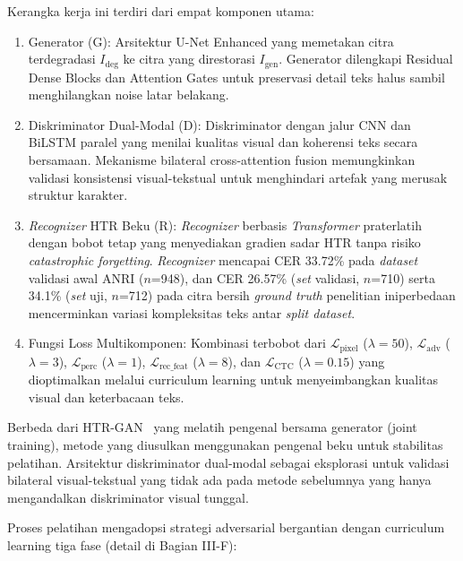 \documentclass[journal]{IEEEtran}
\begin{document}
Kerangka kerja ini terdiri dari empat komponen utama:

\begin{enumerate}
    \item Generator (G): Arsitektur U-Net Enhanced yang memetakan citra terdegradasi $I_{\text{deg}}$ ke citra yang direstorasi $I_{\text{gen}}$. Generator dilengkapi Residual Dense Blocks dan Attention Gates untuk preservasi detail teks halus sambil menghilangkan noise latar belakang.
    
    \item Diskriminator Dual-Modal (D): Diskriminator dengan jalur CNN dan BiLSTM paralel yang menilai kualitas visual dan koherensi teks secara bersamaan. Mekanisme bilateral cross-attention fusion memungkinkan validasi konsistensi visual-tekstual untuk menghindari artefak yang merusak struktur karakter.
    
    \item \textit{Recognizer} HTR Beku (R): \textit{Recognizer} berbasis \textit{Transformer} praterlatih dengan bobot tetap yang menyediakan gradien sadar HTR tanpa risiko \textit{catastrophic forgetting}. \textit{Recognizer} mencapai CER 33.72\% pada \textit{dataset} validasi awal ANRI ($n$=948), dan CER 26.57\% (\textit{set} validasi, $n$=710) serta 34.1\% (\textit{set} uji, $n$=712) pada citra bersih \textit{ground truth} penelitian ini\textemdash perbedaan mencerminkan variasi kompleksitas teks antar \textit{split dataset}.
    
    \item Fungsi Loss Multikomponen: Kombinasi terbobot dari $\mathcal{L}_{\text{pixel}}$ ($\lambda=50$), $\mathcal{L}_{\text{adv}}$ ($\lambda=3$), $\mathcal{L}_{\text{perc}}$ ($\lambda=1$), $\mathcal{L}_{\text{rec\_feat}}$ ($\lambda=8$), dan $\mathcal{L}_{\text{CTC}}$ ($\lambda=0.15$) yang dioptimalkan melalui curriculum learning untuk menyeimbangkan kualitas visual dan keterbacaan teks.
\end{enumerate}

Berbeda dari HTR-GAN~\cite{souibgui2021enhance} yang melatih pengenal bersama generator (joint training), metode yang diusulkan menggunakan pengenal beku untuk stabilitas pelatihan. Arsitektur diskriminator dual-modal sebagai eksplorasi untuk validasi bilateral visual-tekstual yang tidak ada pada metode sebelumnya yang hanya mengandalkan diskriminator visual tunggal.

Proses pelatihan mengadopsi strategi adversarial bergantian dengan curriculum learning tiga fase (detail di Bagian III-F):
\end{document}
